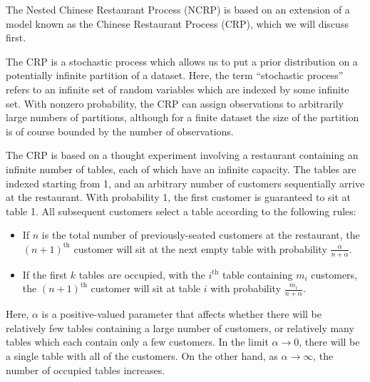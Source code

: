 \documentclass{article}
\newcommand{\nth}{^{\text{th}}}
\begin{document}
The Nested Chinese Restaurant Process (NCRP) is based on an extension of a model known as the Chinese Restaurant Process (CRP), which we will discuss first.

The CRP is a stochastic process which allows us to put a prior distribution on a potentially infinite partition of a dataset.
Here, the term ``stochastic process'' refers to an infinite set of random variables which are indexed by some infinite set.
With nonzero probability, the CRP can assign observations to arbitrarily large numbers of partitions, although for a finite dataset the size of the partition is of course bounded by the number of observations.

The CRP is based on a thought experiment involving a restaurant containing an infinite number of tables, each of which have an infinite capacity.
The tables are indexed starting from 1, and an arbitrary number of customers sequentially arrive at the restaurant.
With probability 1, the first customer is guaranteed to sit at table 1.
All subsequent customers select a table according to the following rules:
\begin{itemize}
\item If $n$ is the total number of previously-seated customers at the restaurant, the $(n+1)\nth$ customer will sit at the next empty table with probability $\frac{\alpha}{n + \alpha}$.
\item If the first $k$ tables are occupied, with the $i\nth$ table containing $m_i$ customers, the $(n+1)\nth$ customer will sit at table $i$ with probability $\frac{m_i}{n+\alpha}$.
\end{itemize}
Here, $\alpha$ is a positive-valued parameter that affects whether there will be relatively few tables containing a large number of customers, or relatively many tables which each contain only a few customers.
In the limit $\alpha \to 0$, there will be a single table with all of the customers.
On the other hand, as $\alpha \to \infty$, the number of occupied tables increases.
\end{document}

